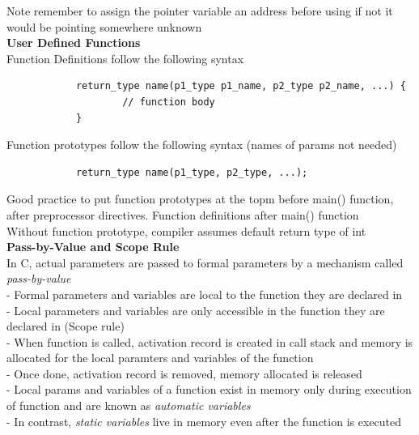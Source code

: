\documentclass[10pt, a4paper]{article}
\begin{document}
\begin{multicols*}{3}
		Note remember to assign the pointer variable an address before using if not it would be pointing somewhere unknown\\
		
		\textbf{User Defined Functions}\\
		Function Definitions follow the following syntax
		\begin{verbatim}
			return_type name(p1_type p1_name, p2_type p2_name, ...) {
				    // function body
			}
		\end{verbatim}
		Function prototypes follow the following syntax (names of params not needed)
		\begin{verbatim}
			return_type name(p1_type, p2_type, ...);
		\end{verbatim}
		Good practice to put function prototypes at the topm before main() function, after preprocessor directives. Function definitions after main() function\\
		
		Without function prototype, compiler assumes default return type of int\\
		
		\textbf{Pass-by-Value and Scope Rule}\\
		In C, actual parameters are passed to formal parameters by a mechanism called \textit{pass-by-value}\\		
		- Formal parameters and variables are local to the function they are declared in\\
		- Local parameters and variables are only accessible in the function they are declared in (Scope rule)\\
		- When function is called, activation record is created in call stack and memory is allocated for the local paramters and variables of the function\\
		- Once done, activation record is removed, memory allocated is released\\
		- Local params and variables of a function exist in memory only during execution of function and are known as \textit{automatic variables}\\
		- In contrast, \textit{static variables} live in memory even after the function is executed\\
		

\end{multicols*}
\end{document}
